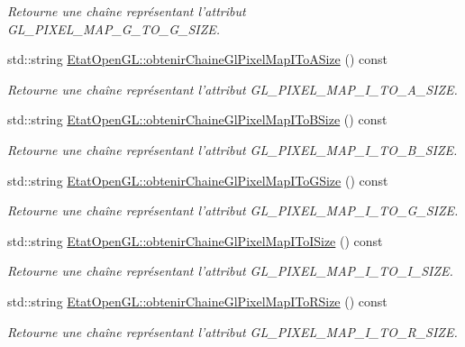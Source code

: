 \begin{DoxyCompactItemize}
\begin{DoxyCompactList}\small\item\em Retourne une chaîne représentant l'attribut G\-L\-\_\-\-P\-I\-X\-E\-L\-\_\-\-M\-A\-P\-\_\-\-G\-\_\-\-T\-O\-\_\-\-G\-\_\-\-S\-I\-Z\-E. \end{DoxyCompactList}\item 
std\-::string \hyperlink{group__utilitaire_gadadb89e110f09aaf815829f028ab539d}{Etat\-Open\-G\-L\-::obtenir\-Chaine\-Gl\-Pixel\-Map\-I\-To\-A\-Size} () const 
\begin{DoxyCompactList}\small\item\em Retourne une chaîne représentant l'attribut G\-L\-\_\-\-P\-I\-X\-E\-L\-\_\-\-M\-A\-P\-\_\-\-I\-\_\-\-T\-O\-\_\-\-A\-\_\-\-S\-I\-Z\-E. \end{DoxyCompactList}\item 
std\-::string \hyperlink{group__utilitaire_ga8fac55d9d77a0b119c7247536471b5fe}{Etat\-Open\-G\-L\-::obtenir\-Chaine\-Gl\-Pixel\-Map\-I\-To\-B\-Size} () const 
\begin{DoxyCompactList}\small\item\em Retourne une chaîne représentant l'attribut G\-L\-\_\-\-P\-I\-X\-E\-L\-\_\-\-M\-A\-P\-\_\-\-I\-\_\-\-T\-O\-\_\-\-B\-\_\-\-S\-I\-Z\-E. \end{DoxyCompactList}\item 
std\-::string \hyperlink{group__utilitaire_gaa449af86fad19dad37eea16a918b3c33}{Etat\-Open\-G\-L\-::obtenir\-Chaine\-Gl\-Pixel\-Map\-I\-To\-G\-Size} () const 
\begin{DoxyCompactList}\small\item\em Retourne une chaîne représentant l'attribut G\-L\-\_\-\-P\-I\-X\-E\-L\-\_\-\-M\-A\-P\-\_\-\-I\-\_\-\-T\-O\-\_\-\-G\-\_\-\-S\-I\-Z\-E. \end{DoxyCompactList}\item 
std\-::string \hyperlink{group__utilitaire_ga0eb7b39aef0ca240d98e9507703cd1e4}{Etat\-Open\-G\-L\-::obtenir\-Chaine\-Gl\-Pixel\-Map\-I\-To\-I\-Size} () const 
\begin{DoxyCompactList}\small\item\em Retourne une chaîne représentant l'attribut G\-L\-\_\-\-P\-I\-X\-E\-L\-\_\-\-M\-A\-P\-\_\-\-I\-\_\-\-T\-O\-\_\-\-I\-\_\-\-S\-I\-Z\-E. \end{DoxyCompactList}\item 
std\-::string \hyperlink{group__utilitaire_gad3cc6e9acee4df62ca1407e6b42d87d4}{Etat\-Open\-G\-L\-::obtenir\-Chaine\-Gl\-Pixel\-Map\-I\-To\-R\-Size} () const 
\begin{DoxyCompactList}\small\item\em Retourne une chaîne représentant l'attribut G\-L\-\_\-\-P\-I\-X\-E\-L\-\_\-\-M\-A\-P\-\_\-\-I\-\_\-\-T\-O\-\_\-\-R\-\_\-\-S\-I\-Z\-E. \end{DoxyCompactList}\item 

\end{DoxyCompactItemize}
